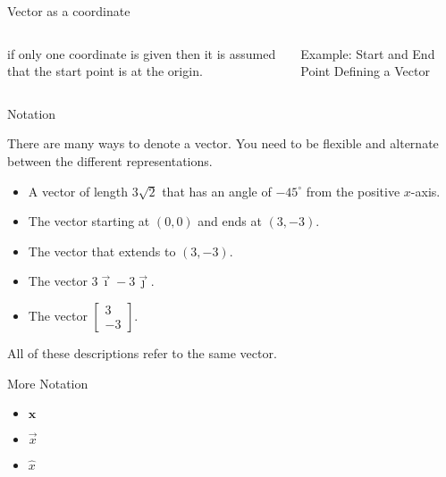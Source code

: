 \documentclass[svgnames,table,,aspectratio=169]{beamer}
\newcommand{\columnVector}[1]{%
  \left[
    \begin{array}{r}
    #1                           
    \end{array}
  \right]
}
\begin{document}
\begin{frame}{Vector as a coordinate}

  \begin{columns}
    if only one coordinate is given then it is assumed that the start
    point is at the origin.


    Example: Start and End Point Defining a Vector

  \end{columns}
\end{frame}


\begin{frame}{Notation}

  There are many ways to denote a vector. You need to be flexible and
  alternate between the different representations.

  \begin{itemize}
  \item A vector of length $3\sqrt{2}$ that has an angle of
    $-45^\circ$ from the positive $x$-axis.
  \item The vector starting at $(0,0)$ and ends at $(3,-3)$.
  \item The vector that extends to $(3,-3)$.
  \item The vector $3\vec{\imath}-3\vec{\jmath}$.
  \item The vector $\columnVector{3 \\ -3}$.
  \end{itemize}
  All of these descriptions refer to the same vector. 
  
\end{frame}

\begin{frame}{More Notation}

  \begin{itemize}
  \item $\textbf{x}$
  \item $\vec{x}$
  \item $\hat{x}$
  \end{itemize}
  
\end{frame}
\end{document}
